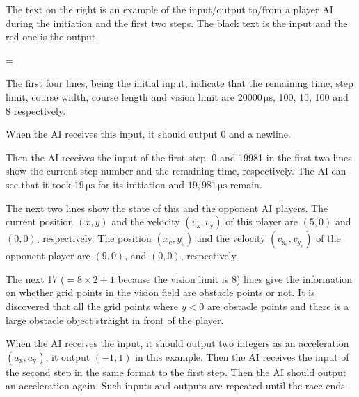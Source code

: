 \documentclass[11pt]{article}
\begin{document}
\begin{minipage}[t]{.6\textwidth}

The text on the right is an example of the input/output to/from a player AI
during the initiation and the first two steps.
The black text is the input and the red one is the output.

\parindent=

The first four lines, being the initial input, indicate that
the remaining time, step limit, course width, course length and vision limit
are $20000\,\si{\micro\second}$, 100, 15, 100 and 8 respectively.

When the AI receives this input, it should output 0 and a newline.

Then the AI receives the input of the first step.
0 and 19981 in the first two lines show the current step number
and the remaining time, respectively.
The AI can see that it took $19\,\si{\micro\second}$ for its initiation and
$19,981\,\si{\micro\second}$ remain.

The next two lines show the state of this and the opponent AI players.
The current position $(x,y)$ and the velocity $(v_\mathrm{x},v_\mathrm{y})$ of this player are $(5,0)$ and
$(0,0)$, respectively.
The position $(x_\mathrm{e},y_\mathrm{e})$ and the velocity $(v_{\mathrm{x}_\mathrm{e}},v_{\mathrm{y}_\mathrm{e}})$ of the opponent player are
$(9,0)$, and $(0,0)$, respectively.

The next 17 ($=8 \times 2 + 1$ because the vision limit is 8) lines give the information on whether grid points in the vision field are obstacle points or not.
It is discovered that all the grid points where $y < 0$ are obstacle points
and there is a large obstacle object straight in front of the player.

When the AI receives the input, it should output two integers as an acceleration $(a_\mathrm{x}, a_\mathrm{y})$;
it output $(-1,1)$ in this example.
Then the AI receives the input of the second step
in the same format to the first step.
Then the AI should output an acceleration again.
Such inputs and outputs are repeated until the race ends.

\end{minipage}
 \hfill
\end{document}
